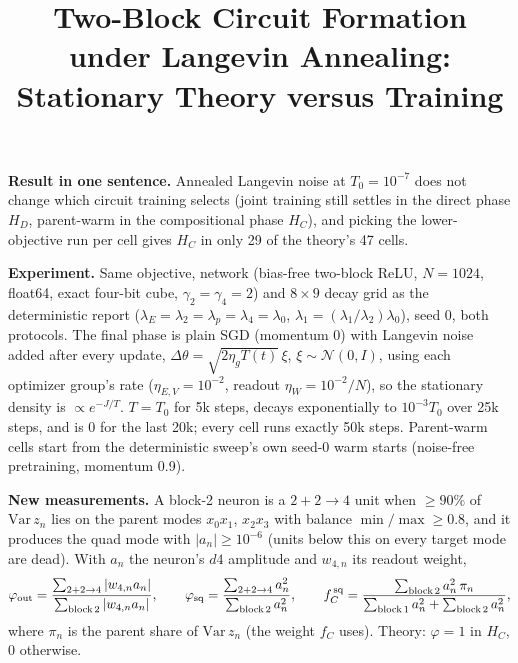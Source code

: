 \documentclass[10pt]{article}
\title{\vspace{-1.15cm}\textbf{Two-Block Circuit Formation under Langevin Annealing:\\Stationary Theory versus Training}}
\author{}
\date{\vspace{-1.3cm}}
\begin{document}
\maketitle
\vspace{-0.75cm}

\textbf{Result in one sentence.}
Annealed Langevin noise at $T_0=10^{-7}$ does not change which circuit training selects (joint
training still settles in the direct phase $H_D$, parent-warm in the compositional phase $H_C$),
and picking the lower-objective run per cell gives $H_C$ in only 29 of the theory's 47 cells.

\textbf{Experiment.}
Same objective, network (bias-free two-block ReLU, $N=1024$, float64, exact four-bit cube,
$\gamma_2=\gamma_4=2$) and $8\times9$ decay grid as the deterministic report
($\lambda_E=\lambda_2=\lambda_p=\lambda_4=\lambda_0$, $\lambda_1=(\lambda_1/\lambda_2)\lambda_0$),
seed 0, both protocols.  The final phase is plain SGD (momentum 0) with Langevin noise added
after every update, $\Delta\theta=\sqrt{2\eta_g T(t)}\,\xi$, $\xi\sim\mathcal N(0,I)$, using each
optimizer group's rate ($\eta_{E,V}=10^{-2}$, readout $\eta_W=10^{-2}/N$), so the stationary
density is $\propto e^{-J/T}$.  $T=T_0$ for 5k steps, decays exponentially to $10^{-3}T_0$ over
25k steps, and is 0 for the last 20k; every cell runs exactly 50k steps.  Parent-warm cells start
from the deterministic sweep's own seed-0 warm starts (noise-free pretraining, momentum 0.9).

\textbf{New measurements.}  A block-2 neuron is a $2{+}2{\to}4$ unit when $\ge 90\%$ of
$\mathrm{Var}\,z_n$ lies on the parent modes $x_0x_1$, $x_2x_3$ with balance
$\min/\max\ge0.8$, and it produces the quad mode with $|a_n|\ge10^{-6}$ (units below this on every
target mode are dead).  With $a_n$ the neuron's $d4$ amplitude and $w_{4,n}$ its readout weight,
\[
\varphi_{\rm out}=\frac{\sum_{2+2\to4}|w_{4,n}a_n|}{\sum_{\rm block\,2}|w_{4,n}a_n|},\qquad
\varphi_{\rm sq}=\frac{\sum_{2+2\to4}a_n^2}{\sum_{\rm block\,2}a_n^2},\qquad
f_C^{\,\rm sq}=\frac{\sum_{\rm block\,2}a_n^2\,\pi_n}{\sum_{\rm block\,1}a_n^2+\sum_{\rm block\,2}a_n^2},
\]
where $\pi_n$ is the parent share of $\mathrm{Var}\,z_n$ (the weight $f_C$ uses).  Theory:
$\varphi=1$ in $H_C$, 0 otherwise.
\end{document}
